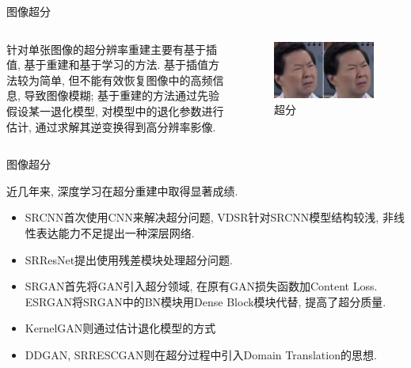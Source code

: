 \begin{frame}{图像超分}
    \begin{columns}
        针对单张图像的超分辨率重建主要有基于插值, 基于重建和基于学习的方法. 基于插值方法较为简单, 但不能有效恢复图像中的高频信息, 导致图像模糊; 基于重建的方法通过先验假设某一退化模型, 对模型中的退化参数进行估计, 通过求解其逆变换得到高分辨率影像. 

        \begin{figure}
            \centering
            \includegraphics[width=\textwidth]{pic/chap0107.jpg}
            \caption{超分}
            \label{fig:0106}
        \end{figure}

    \end{columns}
\end{frame}

\begin{frame}{图像超分}
    

    近几年来, 深度学习在超分重建中取得显著成绩. 
    
    \begin{itemize}
        \item SRCNN首次使用CNN来解决超分问题, VDSR针对SRCNN模型结构较浅, 非线性表达能力不足提出一种深层网络.
        \item SRResNet提出使用残差模块处理超分问题. 
        \item SRGAN首先将GAN引入超分领域, 在原有GAN损失函数加Content Loss. ESRGAN将SRGAN中的BN模块用Dense Block模块代替, 提高了超分质量.
        \item KernelGAN则通过估计退化模型的方式 
        \item DDGAN, SRRESCGAN则在超分过程中引入Domain Translation的思想.
    \end{itemize}
    
       
\end{frame}
